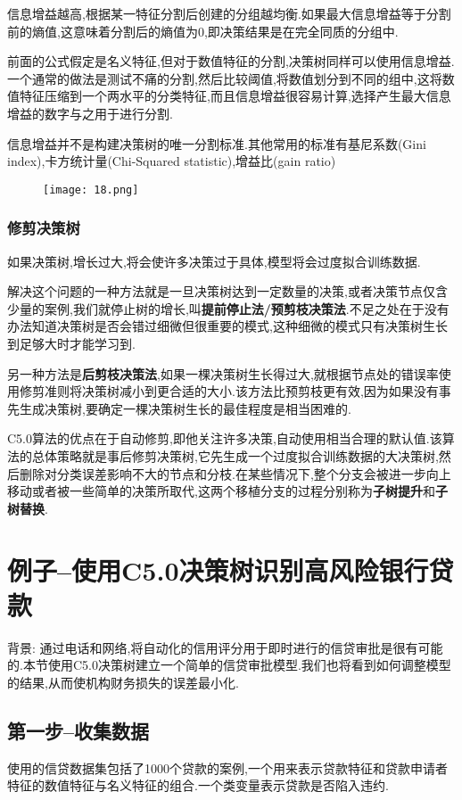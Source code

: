 \documentclass[11pt,a4paper,oneside]{book}
\begin{document}
信息增益越高,根据某一特征分割后创建的分组越均衡.如果最大信息增益等于分割前的熵值,这意味着分割后的熵值为0,即决策结果是在完全同质的分组中.

前面的公式假定是名义特征,但对于数值特征的分割,决策树同样可以使用信息增益.一个通常的做法是测试不痛的分割,然后比较阈值,将数值划分到不同的组中,这将数值特征压缩到一个两水平的分类特征,而且信息增益很容易计算,选择产生最大信息增益的数字与之用于进行分割.
\begin{tcolorbox}[colback=pink!10!white,colframe=pink!100!black]
信息增益并不是构建决策树的唯一分割标准.其他常用的标准有基尼系数(Gini index),卡方统计量(Chi-Squared statistic),增益比(gain ratio)
\begin{figure}[H]
	\centering
	\texttt{[image: 18.png]}
\end{figure}
\end{tcolorbox}
\subsubsection{修剪决策树}
如果决策树,增长过大,将会使许多决策过于具体,模型将会过度拟合训练数据.

解决这个问题的一种方法就是一旦决策树达到一定数量的决策,或者决策节点仅含少量的案例,我们就停止树的增长,叫\textbf{提前停止法/预剪枝决策法}.不足之处在于没有办法知道决策树是否会错过细微但很重要的模式,这种细微的模式只有决策树生长到足够大时才能学习到.

另一种方法是\textbf{后剪枝决策法},如果一棵决策树生长得过大,就根据节点处的错误率使用修剪准则将决策树减小到更合适的大小.该方法比预剪枝更有效,因为如果没有事先生成决策树,要确定一棵决策树生长的最佳程度是相当困难的.

C5.0算法的优点在于自动修剪,即他关注许多决策,自动使用相当合理的默认值.该算法的总体策略就是事后修剪决策树,它先生成一个过度拟合训练数据的大决策树,然后删除对分类误差影响不大的节点和分枝.在某些情况下,整个分支会被进一步向上移动或者被一些简单的决策所取代,这两个移植分支的过程分别称为\textbf{子树提升}和\textbf{子树替换}.

\section{例子--使用C5.0决策树识别高风险银行贷款}
背景: 通过电话和网络,将自动化的信用评分用于即时进行的信贷审批是很有可能的.本节使用C5.0决策树建立一个简单的信贷审批模型.我们也将看到如何调整模型的结果,从而使机构财务损失的误差最小化.
\subsection{第一步--收集数据}
使用的信贷数据集包括了1000个贷款的案例,一个用来表示贷款特征和贷款申请者特征的数值特征与名义特征的组合.一个类变量表示贷款是否陷入违约.
\end{document}

